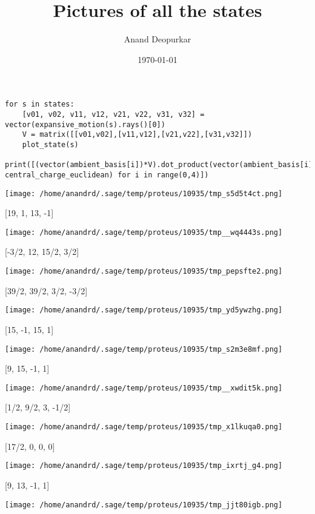 \documentclass[11pt]{article}
\author{Anand Deopurkar}
\date{\today}
\title{Pictures of all the states}
\begin{document}
\maketitle
\tableofcontents

\begin{verbatim}
for s in states:
    [v01, v02, v11, v12, v21, v22, v31, v32] = vector(expansive_motion(s).rays()[0])
    V = matrix([[v01,v02],[v11,v12],[v21,v22],[v31,v32]])
    plot_state(s)
    print([(vector(ambient_basis[i])*V).dot_product(vector(ambient_basis[i])* central_charge_euclidean) for i in range(0,4)])
\end{verbatim}

\begin{center}
\texttt{[image: /home/anandrd/.sage/temp/proteus/10935/tmp\_s5d5t4ct.png]}
\end{center}
[19, 1, 13, -1]
\begin{center}
\texttt{[image: /home/anandrd/.sage/temp/proteus/10935/tmp\_\_wq4443s.png]}
\end{center}
[-3/2, 12, 15/2, 3/2]
\begin{center}
\texttt{[image: /home/anandrd/.sage/temp/proteus/10935/tmp\_pepsfte2.png]}
\end{center}
[39/2, 39/2, 3/2, -3/2]
\begin{center}
\texttt{[image: /home/anandrd/.sage/temp/proteus/10935/tmp\_yd5ywzhg.png]}
\end{center}
[15, -1, 15, 1]
\begin{center}
\texttt{[image: /home/anandrd/.sage/temp/proteus/10935/tmp\_s2m3e8mf.png]}
\end{center}
[9, 15, -1, 1]
\begin{center}
\texttt{[image: /home/anandrd/.sage/temp/proteus/10935/tmp\_\_xwdit5k.png]}
\end{center}
[1/2, 9/2, 3, -1/2]
\begin{center}
\texttt{[image: /home/anandrd/.sage/temp/proteus/10935/tmp\_x1lkuqa0.png]}
\end{center}
[17/2, 0, 0, 0]
\begin{center}
\texttt{[image: /home/anandrd/.sage/temp/proteus/10935/tmp\_ixrtj\_g4.png]}
\end{center}
[9, 13, -1, 1]
\begin{center}
\texttt{[image: /home/anandrd/.sage/temp/proteus/10935/tmp\_jjt80igb.png]}
\end{center}
\end{document}

